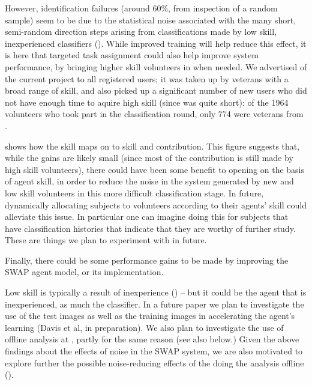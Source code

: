 \documentclass[useAMS,usenatbib,a4paper]{mn2e}
\begin{document}
However, identification failures (around 60\%, from inspection of a random sample)
seem to be due to the statistical noise associated with
the many short, semi-random direction steps arising from classifications made by
low skill, inexperienced
classifiers ().
While improved training will help reduce this effect, it is here
that targeted task assignment could also help improve system performance, by
bringing higher skill volunteers in when needed. We
advertised \StageTwo of the current project to all registered users; it was
taken up by \StageOne veterans with a broad range of skill, and also picked up a
significant number of new users who did not have enough time to aquire high
skill (since \StageTwo was quite short): of the 1964 volunteers who took part in
the \StageTwo classification round, only 774 were veterans from \StageOne.

 shows how the \StageOne
skill maps on to \StageTwo skill and contribution. This figure suggests
that, while the gains are likely small (since  most of the contribution
is still made by high skill volunteers),  there could have been some
benefit to opening \StageTwo on the basis of \StageOne agent skill, in
order to reduce the noise in the system generated by new and low skill
volunteers in this more difficult classification stage.  In future,
dynamically allocating subjects to volunteers according to their agents'
skill could alleviate this issue. In particular one can imagine doing this
for subjects that have classification histories that indicate that they
are worthy of further study.
These are things we plan to
experiment with in future.

Finally, there could be some performance gains to be made by improving the SWAP
agent model, or its implementation.

Low skill is typically a result  of inexperience () --
but it could be the agent  that is inexperienced, as much  the classifier.  In a
future paper we plan to investigate the use of the test images as well as the
training images in accelerating the agent's learning (Davis et al, in
preparation). We also plan to investigate the use of offline analysis at
\StageOne, partly for the same reason (see also 
below.) Given the above findings  about the effects of noise in the SWAP system,
we are also motivated to explore further the possible noise-reducing effects of
the doing the analysis offline ().
\end{document}

